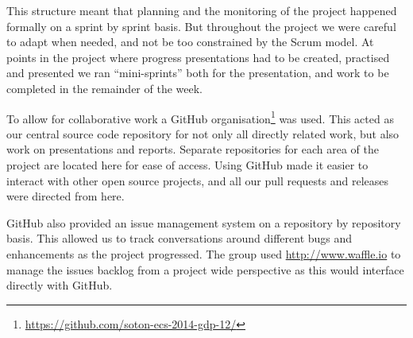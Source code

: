 This structure meant that planning and the monitoring of the project happened formally on a sprint by sprint basis. But throughout the project we were careful to adapt when needed, and not be too constrained by the Scrum model. At points in the project where progress presentations had to be created, practised and presented we ran ``mini-sprints'' both for the presentation, and work to be completed in the remainder of the week.



To allow for collaborative work a GitHub organisation\footnote{\url{https://github.com/soton-ecs-2014-gdp-12/}} was used. This acted as our central source code repository for not only all directly related work, but also work on presentations and reports. Separate repositories for each area of the project are located here for ease of access. Using GitHub made it easier to interact with other open source projects, and all our pull requests and releases were directed from here. 

GitHub also provided an issue management system on a repository by repository basis. This allowed us to track conversations around different bugs and enhancements as the project progressed.
The group used \url{http://www.waffle.io} to manage the issues backlog from a project wide perspective as this would interface directly with GitHub.






